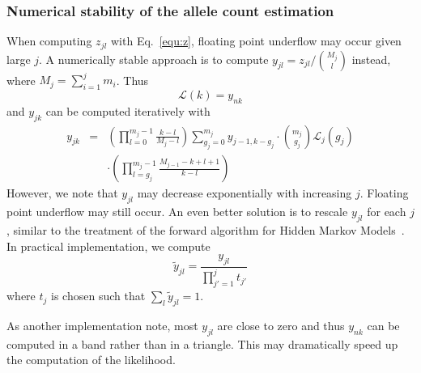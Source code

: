 \documentclass{bioinfo}
\begin{document}
\begin{methods}
\subsubsection{Numerical stability of the allele count estimation}
When computing $z_{jl}$ with Eq.~\eqref{equ:z}, floating point underflow may
occur given large $j$. A numerically stable approach is to compute
$y_{jl}=z_{jl}/\binom{M_j}{l}$ instead, where $M_j=\sum_{i=1}^j m_i$. Thus
\begin{equation}\label{equ:klky}
\mathcal{L}(k)=y_{nk}
\end{equation}
and $y_{jk}$ can be computed iteratively with
\begin{eqnarray}\label{equ:y}
y_{jk}&=&\left(\prod_{l=0}^{m_j-1}\frac{k-l}{M_{j}-l}\right)\sum_{g_j=0}^{m_j}y_{j-1,k-g_j}\cdot\binom{m_j}{g_j}\mathcal{L}_j(g_j)\\\nonumber
	&&\cdot\left(\prod_{l=g_j}^{m_j-1}\frac{M_{j-1}-k+l+1}{k-l}\right)
\end{eqnarray}
However, we note that $y_{jl}$ may decrease exponentially with increasing $j$.
Floating point underflow may still occur. An even better solution is to rescale
$y_{jl}$ for each $j$, similar to the treatment of the forward algorithm for
Hidden Markov Models~\citep{Durbin:1998uq}. In practical implementation, we
compute
\begin{equation}\label{eq:rescale}
\tilde{y}_{jl}=\frac{y_{jl}}{\prod_{j'=1}^jt_{j'}}
\end{equation}
where $t_{j}$ is chosen such that $\sum_{l}\tilde{y}_{jl}=1$.

As another implementation note, most $y_{jl}$ are close to zero and thus
$y_{nk}$ can be computed in a band rather than in a triangle. This may
dramatically speed up the computation of the likelihood.


\end{methods}
\end{document}
